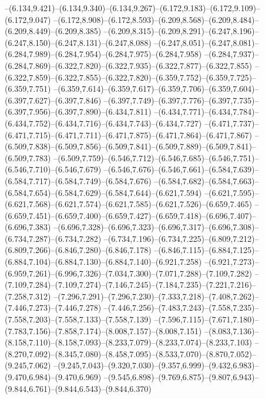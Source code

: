   --(6.134,9.421)--(6.134,9.340)--(6.134,9.267)--(6.172,9.183)--(6.172,9.109)--(6.172,9.047)%
  --(6.172,8.908)--(6.172,8.593)--(6.209,8.568)--(6.209,8.484)--(6.209,8.449)--(6.209,8.385)%
  --(6.209,8.315)--(6.209,8.291)--(6.247,8.196)--(6.247,8.150)--(6.247,8.131)--(6.247,8.088)%
  --(6.247,8.051)--(6.247,8.081)--(6.284,7.989)--(6.284,7.954)--(6.284,7.975)--(6.284,7.958)%
  --(6.284,7.937)--(6.284,7.869)--(6.322,7.820)--(6.322,7.935)--(6.322,7.877)--(6.322,7.855)%
  --(6.322,7.859)--(6.322,7.855)--(6.322,7.820)--(6.359,7.752)--(6.359,7.725)--(6.359,7.751)%
  --(6.359,7.614)--(6.359,7.617)--(6.359,7.706)--(6.359,7.604)--(6.397,7.627)--(6.397,7.846)%
  --(6.397,7.749)--(6.397,7.776)--(6.397,7.735)--(6.397,7.956)--(6.397,7.890)--(6.434,7.811)%
  --(6.434,7.771)--(6.434,7.784)--(6.434,7.752)--(6.434,7.716)--(6.434,7.743)--(6.434,7.727)%
  --(6.471,7.737)--(6.471,7.715)--(6.471,7.711)--(6.471,7.875)--(6.471,7.864)--(6.471,7.867)%
  --(6.509,7.838)--(6.509,7.856)--(6.509,7.841)--(6.509,7.889)--(6.509,7.841)--(6.509,7.783)%
  --(6.509,7.759)--(6.546,7.712)--(6.546,7.685)--(6.546,7.751)--(6.546,7.710)--(6.546,7.679)%
  --(6.546,7.676)--(6.546,7.661)--(6.584,7.639)--(6.584,7.717)--(6.584,7.749)--(6.584,7.676)%
  --(6.584,7.682)--(6.584,7.663)--(6.584,7.654)--(6.584,7.629)--(6.584,7.644)--(6.621,7.594)%
  --(6.621,7.595)--(6.621,7.568)--(6.621,7.574)--(6.621,7.585)--(6.621,7.526)--(6.659,7.465)%
  --(6.659,7.451)--(6.659,7.400)--(6.659,7.427)--(6.659,7.418)--(6.696,7.407)--(6.696,7.383)%
  --(6.696,7.328)--(6.696,7.323)--(6.696,7.317)--(6.696,7.308)--(6.734,7.287)--(6.734,7.282)%
  --(6.734,7.196)--(6.734,7.225)--(6.809,7.212)--(6.809,7.266)--(6.846,7.280)--(6.846,7.178)%
  --(6.846,7.115)--(6.884,7.125)--(6.884,7.104)--(6.884,7.130)--(6.884,7.140)--(6.921,7.258)%
  --(6.921,7.273)--(6.959,7.261)--(6.996,7.326)--(7.034,7.300)--(7.071,7.288)--(7.109,7.282)%
  --(7.109,7.284)--(7.109,7.274)--(7.146,7.245)--(7.184,7.235)--(7.221,7.216)--(7.258,7.312)%
  --(7.296,7.291)--(7.296,7.230)--(7.333,7.218)--(7.408,7.262)--(7.446,7.273)--(7.446,7.278)%
  --(7.446,7.256)--(7.483,7.243)--(7.558,7.235)--(7.558,7.203)--(7.558,7.133)--(7.558,7.139)%
  --(7.596,7.115)--(7.671,7.180)--(7.783,7.156)--(7.858,7.174)--(8.008,7.157)--(8.008,7.151)%
  --(8.083,7.136)--(8.158,7.110)--(8.158,7.093)--(8.233,7.079)--(8.233,7.074)--(8.233,7.103)%
  --(8.270,7.092)--(8.345,7.080)--(8.458,7.095)--(8.533,7.070)--(8.870,7.052)--(9.245,7.062)%
  --(9.245,7.043)--(9.320,7.030)--(9.357,6.999)--(9.432,6.983)--(9.470,6.984)--(9.470,6.969)%
  --(9.545,6.898)--(9.769,6.875)--(9.807,6.943)--(9.844,6.761)--(9.844,6.543)--(9.844,6.370)%

